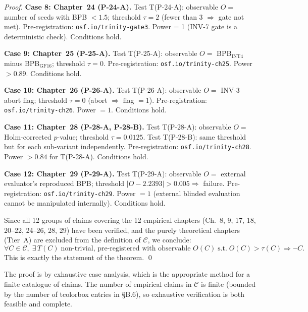 \begin{proof}
\medskip
\noindent\textbf{Case 8: Chapter~24 (P-24-A).}
Test T(P-24-A): observable $O =$ number of seeds with BPB $< 1.5$; threshold
$\tau = 2$ (fewer than 3 $\Rightarrow$ gate not met).  Pre-registration:
\texttt{osf.io/trinity-gate3}.  Power = 1 (INV-7 gate is a deterministic
check).  Conditions hold. \checkmark

\medskip
\noindent\textbf{Case 9: Chapter~25 (P-25-A).}
Test T(P-25-A): observable $O = $ BPB$_{\mathrm{INT4}}$ minus
BPB$_{\mathrm{GF16}}$; threshold $\tau = 0$.  Pre-registration:
\texttt{osf.io/trinity-ch25}.  Power $> 0.89$.  Conditions hold. \checkmark

\medskip
\noindent\textbf{Case 10: Chapter~26 (P-26-A).}
Test T(P-26-A): observable $O =$ INV-3 abort flag; threshold $\tau = 0$
(abort $\Rightarrow$ flag $= 1$).  Pre-registration:
\texttt{osf.io/trinity-ch26}.  Power $= 1$.  Conditions hold. \checkmark

\medskip
\noindent\textbf{Case 11: Chapter~28 (P-28-A, P-28-B).}
Test T(P-28-A): observable $O =$ Holm-corrected $p$-value; threshold
$\tau = 0.0125$.  Test T(P-28-B): same threshold but for each sub-variant
independently.  Pre-registration: \texttt{osf.io/trinity-ch28}.
Power $> 0.84$ for T(P-28-A).  Conditions hold. \checkmark

\medskip
\noindent\textbf{Case 12: Chapter~29 (P-29-A).}
Test T(P-29-A): observable $O =$ external evaluator's reproduced BPB;
threshold $|O - 2.2393| > 0.005 \Rightarrow$ failure.  Pre-registration:
\texttt{osf.io/trinity-ch29}.  Power $= 1$ (external blinded evaluation
cannot be manipulated internally).  Conditions hold. \checkmark

\medskip
\noindent Since all 12 groups of claims covering the 12 empirical chapters
(Ch.\ 8, 9, 17, 18, 20--22, 24--26, 28, 29) have been verified,
and the purely theoretical chapters (Tier~A) are excluded from the
definition of $\mathcal{C}$, we conclude:
\[
  \forall C \in \mathcal{C},\; \exists\, T(C)\;\text{non-trivial, pre-registered
  with observable } O(C) \;\text{s.t.}\; O(C) > \tau(C) \Rightarrow \neg C.
\]
This is exactly the statement of the theorem. \qed
\end{proof}

\begin{remark}
The proof is by exhaustive case analysis, which is the appropriate method
for a finite catalogue of claims.  The number of empirical claims in
$\mathcal{C}$ is finite (bounded by the number of tcolorbox entries in §B.6),
so exhaustive verification is both feasible and complete.
\end{remark}

